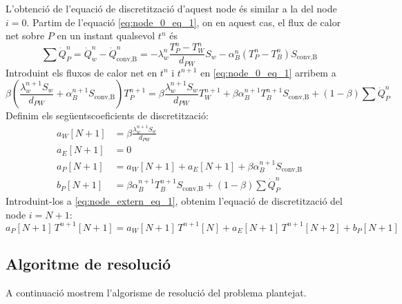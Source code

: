 L'obtenció de l'equació de discretització d'aquest node és similar a la del node $i = 0$. Partim de l'equació \eqref{eq:node_0_eq_1}, on en aquest cas, el flux de calor net sobre $P$ en un instant qualsevol $t^n$ és
\begin{equation} \label{eq:node_extern_fluxe_calor}
	\sum \dot{Q}_P^n = 
	\dot{Q}_w^n - \dot{Q}_\text{conv,B}^n = 
	-\lambda_w^n \frac{T_P^n - T_W^n}{d_{PW}} S_w - \alpha_B^n \left( T_P^n - T_B^n \right) S_\text{conv,B}
\end{equation}
Introduint els fluxos de calor net en $t^{n}$ i $t^{n+1}$ en \eqref{eq:node_0_eq_1} arribem a
\begin{equation} \label{eq:node_extern_eq_1}
	\beta \left(\frac{\lambda_w^{n+1} S_w}{d_{PW}} + \alpha_B^{n+1} S_\text{conv,B} \right) T_P^{n+1} = 
	\beta \frac{\lambda_w^{n+1} S_w}{d_{PW}} T_W^{n+1} + 
	\beta \alpha_B^{n+1} T_B^{n+1} S_\text{conv,B} + 
	(1 - \beta) \sum \dot{Q}_P^n
\end{equation}
Definim els següentscoeficients de discretització:
\begin{align} 
	a_W[N+1] &= \beta \frac{\lambda_w^{n+1} S_w}{d_{PW}} 					\\
	a_E[N+1] &= 0 															\\
	a_P[N+1] &= a_W[N+1] + a_E[N+1] + \beta \alpha_B^{n+1} S_\text{conv,B}	\\
	b_P[N+1] &= \beta \alpha_B^{n+1} T_B^{n+1} S_\text{conv,B} + (1 - \beta) \sum \dot{Q}_P^n
\end{align}
Introduint-los a \ref{eq:node_extern_eq_1}, obtenim l'equació de discretització del node $i = N + 1$:
\begin{equation}
	a_P[N+1] \, T^{n+1}[N+1] = a_W[N+1] \, T^{n+1}[N] + a_E[N+1] \, T^{n+1}[N+2] + b_P[N+1]
\end{equation}

\subsection{Algoritme de resolució}

A continuació mostrem l'algorisme de resolució del problema plantejat.

